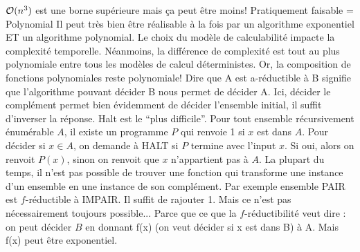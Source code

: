 \begin{mcqs}
  {}
  {$\mathcal{O}(n^{3})$ est une borne supérieure mais ça peut être moins!}
  {}
  {Pratiquement faisable = Polynomial}
  {Il peut très bien être réalisable à la fois par un algorithme exponentiel ET un algorithme polynomial.}
  {Le choix du modèle de calculabilité impacte la complexité temporelle. Néanmoins, la différence de complexité est tout au plus polynomiale entre tous les modèles de calcul déterministes. Or, la composition de fonctions polynomiales reste polynomiale!}
  {Dire que A est a-réductible à B signifie que l'algorithme pouvant décider B nous permet de décider A. Ici, décider le complément permet bien évidemment de décider l'ensemble initial, il suffit d'inverser la réponse.}
  {Halt est le ``plus difficile''. Pour tout ensemble récursivement énumérable $A$, il existe un programme $P$ qui renvoie 1 si $x$ est dans $A$. Pour décider si $x \in A$, on demande à HALT si $P$ termine avec l'input $x$. Si oui, alors on renvoit $P(x)$, sinon on renvoit que $x$ n'appartient pas à $A$.}
  {La plupart du temps, il n'est pas possible de trouver une fonction qui transforme une instance d'un ensemble en une instance de son complément. Par exemple ensemble PAIR est $f$-réductible à IMPAIR. Il suffit de rajouter 1. Mais ce n'est pas nécessairement toujours possible...}
  {Parce que ce que la $f$-réductibilité veut dire : on peut décider $B$ en donnant f(x) (on veut décider si x est dans B) à A. Mais f(x) peut être exponentiel.}
\end{mcqs}
